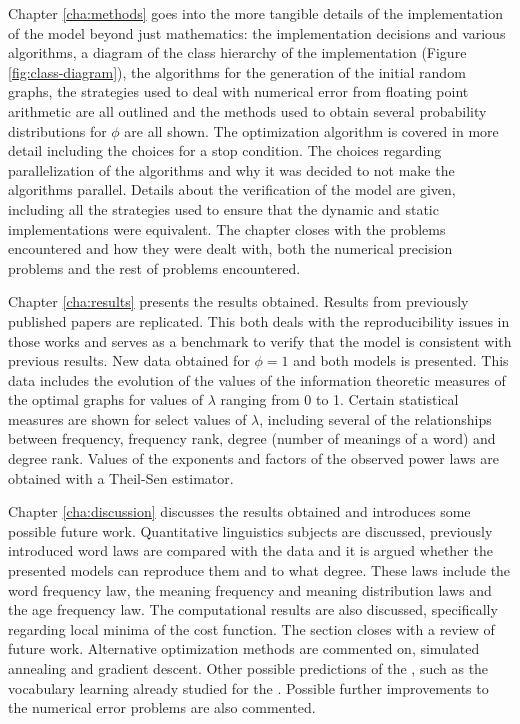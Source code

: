 Chapter \ref{cha:methods} goes into the more tangible details of the implementation of the model beyond just mathematics: the implementation decisions and various algorithms, a diagram of the class hierarchy of the implementation (Figure \ref{fig:class-diagram}), the algorithms for the generation of the initial random graphs, the strategies used to deal with numerical error from floating point arithmetic are all outlined and the methods used to obtain several probability distributions for $\phi$ are all shown.
The optimization algorithm is covered in more detail including the choices for a stop condition.
The choices regarding parallelization of the algorithms and why it was decided to not make the algorithms parallel.
Details about the verification of the model are given, including all the strategies used to ensure that the dynamic and static implementations were equivalent.
The chapter closes with the problems encountered and how they were dealt with, both the numerical precision problems and the rest of problems encountered.

Chapter \ref{cha:results} presents the results obtained.
Results from previously published papers \cite{Ferrer2005a} \cite{Ferrer2003a} are replicated.
This both deals with the reproducibility issues in those works and serves as a benchmark to verify that the model is consistent with previous results.
New data obtained for $\phi=1$ and both models is presented.
This data includes the evolution of the values of the information theoretic measures of the optimal graphs for values of $\lambda$ ranging from 0 to 1.
Certain statistical measures are shown for select values of $\lambda$, including several of the relationships between frequency, frequency rank, degree (number of meanings of a word) and degree rank.
Values of the exponents and factors of the observed power laws are obtained with a Theil-Sen estimator.

Chapter \ref{cha:discussion} discusses the results obtained and introduces some possible future work.
Quantitative linguistics subjects are discussed, previously introduced word laws are compared with the data and it is argued whether the presented models can reproduce them and to what degree.
These laws include the word frequency law, the meaning frequency and meaning distribution laws and the age frequency law.
The computational results are also discussed, specifically regarding local minima of the cost function.
The section closes with a review of future work.
Alternative optimization methods are commented on, simulated annealing and gradient descent.
Other possible predictions of the \secondmodel{}, such as the vocabulary learning already studied for the \firstmodel{} \cite{Ferrer2017a} \cite{Carrera2021a}.
Possible further improvements to the numerical error problems are also commented.

